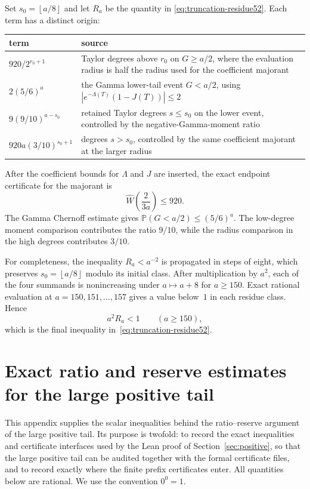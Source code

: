 \documentclass[11pt]{article}
\theoremstyle{definition}
\theoremstyle{remark}
\newcommand{\floor}[1]{\left\lfloor #1\right\rfloor}
\begin{document}
Set $s_0=\floor{a/8}$ and let $R_a$ be the quantity in
\eqref{eq:truncation-residue52}.  Each term has a distinct origin:
\begin{center}
\begin{tabular}{p{}p{}}
\toprule
term & source\\
\midrule
$920/2^{r_0+1}$ & Taylor degrees above $r_0$ on $G\ge a/2$, where the
  evaluation radius is half the radius used for the coefficient majorant\\
$2(5/6)^a$ & the Gamma lower-tail event $G<a/2$, using
  $|e^{-\Lambda(T)}(1-J(T))|\le2$\\
$9(9/10)^{a-s_0}$ & retained Taylor degrees $s\le s_0$ on the lower event,
  controlled by the negative-Gamma-moment ratio\\
$920a(3/10)^{s_0+1}$ & degrees $s>s_0$, controlled by the same coefficient
  majorant at the larger radius\\
\bottomrule
\end{tabular}
\end{center}
After the coefficient bounds for $\Lambda$ and $J$ are inserted, the exact
endpoint certificate for the majorant is
\[
 \widehat W\!\left(\frac{2}{3a}\right)\le920.
\]  The
Gamma Chernoff estimate gives
$\mathbb P(G<a/2)\le(5/6)^a$.  The low-degree moment comparison contributes
the ratio $9/10$, while the radius comparison in the high degrees contributes
$3/10$.

For completeness, the inequality $R_a<a^{-2}$ is propagated in steps of
eight, which preserves $s_0=\floor{a/8}$ modulo its initial class.  After
multiplication by $a^2$, each of the four summands is nonincreasing under
$a\mapsto a+8$ for $a\ge150$.  Exact rational evaluation at
$a=150,151,\ldots,157$ gives a value below~$1$ in each residue class.  Hence
\[
 a^2R_a<1\qquad(a\ge150),
\]
which is the final inequality in~\eqref{eq:truncation-residue52}.

\section{Exact ratio and reserve estimates for the large positive tail}
\label{app:large-tail-details}

This appendix supplies the scalar inequalities behind the ratio--reserve
argument of the large positive tail.  Its purpose is twofold: to record the exact
inequalities and certificate interfaces used by the Lean proof of
Section~\ref{sec:positive}, so that the large positive tail can be audited
together with the formal certificate files, and to record exactly where the finite
prefix certificates enter.
All quantities below are rational.  We use the convention $0^0=1$.
\end{document}
